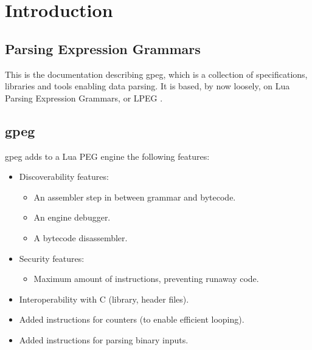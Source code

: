 \section{Introduction}

\subsection{Parsing Expression Grammars}

This is the documentation describing gpeg, which is a collection of
specifications, libraries and tools enabling data parsing. It is based, by
now loosely, on Lua Parsing Expression Grammars, or LPEG \cite{bib:peg}.

\subsection{gpeg}

gpeg adds to a Lua PEG engine the following features:

\begin{itemize}
\item Discoverability features:

  \begin{itemize}
  \item An assembler step in between grammar and bytecode.
  \item An engine debugger.
  \item A bytecode disassembler.
  \end{itemize}

\item Security features:

  \begin{itemize}
  \item Maximum amount of instructions, preventing runaway code.
  \end{itemize}

\item Interoperability with C (library, header files).
\item Added instructions for counters (to enable efficient looping).
\item Added instructions for parsing binary inputs.
\end{itemize}
